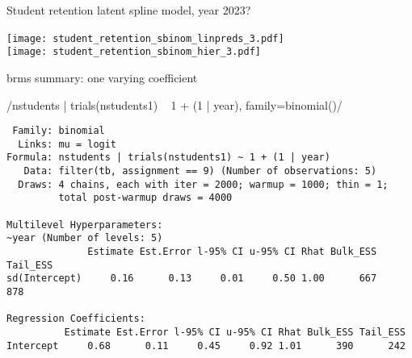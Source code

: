 \documentclass[finnish,english,t]{beamer}
\begin{document}
\begin{frame}{Student retention latent spline model, year 2023?}

  \vspace{-0.5\baselineskip}
  \hspace{-8mm}\texttt{[image: student\_retention\_sbinom\_linpreds\_3.pdf]}
  {\\\hspace{-5mm}\texttt{[image: student\_retention\_sbinom\_hier\_3.pdf]}}

\end{frame}

\begin{frame}[fragile]{brms summary: one varying coefficient}

  \footnotesize
\rinline/nstudents | trials(nstudents1) ~ 1 + (1 | year), family=binomial()/

\begin{verbatim}
 Family: binomial 
  Links: mu = logit 
Formula: nstudents | trials(nstudents1) ~ 1 + (1 | year) 
   Data: filter(tb, assignment == 9) (Number of observations: 5) 
  Draws: 4 chains, each with iter = 2000; warmup = 1000; thin = 1;
         total post-warmup draws = 4000

Multilevel Hyperparameters:
~year (Number of levels: 5) 
              Estimate Est.Error l-95% CI u-95% CI Rhat Bulk_ESS Tail_ESS
sd(Intercept)     0.16      0.13     0.01     0.50 1.00      667      878

Regression Coefficients:
          Estimate Est.Error l-95% CI u-95% CI Rhat Bulk_ESS Tail_ESS
Intercept     0.68      0.11     0.45     0.92 1.01      390      242
\end{verbatim}

\end{frame}
\end{document}
